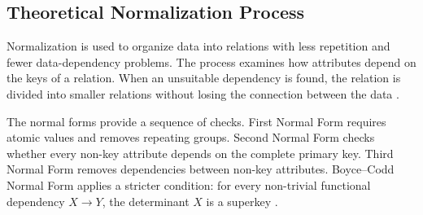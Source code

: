 \subsection{Theoretical Normalization Process}
\label{subsec:theoretical-normalization}

Normalization is used to organize data into relations with less repetition and
fewer data-dependency problems. The process examines how attributes depend on
the keys of a relation. When an unsuitable dependency is found, the relation
is divided into smaller relations without losing the connection between the
data \cite{codd1972further}.

The normal forms provide a sequence of checks. First Normal Form requires
atomic values and removes repeating groups. Second Normal Form checks whether
every non-key attribute depends on the complete primary key. Third Normal Form
removes dependencies between non-key attributes. Boyce--Codd Normal Form
applies a stricter condition: for every non-trivial functional dependency
\(X \rightarrow Y\), the determinant \(X\) is a superkey
\cite{kent1983five}.

